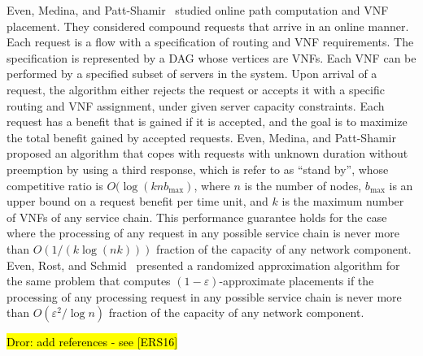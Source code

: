 \documentclass[runningheads]{llncs}
\newcommand{\eps}{\varepsilon}
\newcommand{\dror}[1]{\sethlcolor{yellow}\hl{Dror: #1}}
\begin{document}
Even, Medina, and Patt-Shamir~\cite{EMP16} studied online path
computation and VNF placement.  They considered compound requests that
arrive in an online manner.  Each request is a flow with a
specification of routing and VNF requirements.  The specification is
represented by a DAG whose vertices are VNFs.  Each VNF can be
performed by a specified subset of servers in the system.  Upon
arrival of a request, the algorithm either rejects the request or
accepts it with a specific routing and VNF assignment, under given
server capacity constraints.  Each request has a benefit that is
gained if it is accepted, and the goal is to maximize the total
benefit gained by accepted requests.
%
Even, Medina, and Patt-Shamir~\cite{EMP16} proposed an algorithm that
copes with requests with unknown duration without preemption by using
a third response, which is refer to as “stand by”, whose competitive
ratio is $O(\log (knb_{\max})$, where $n$ is the number of nodes,
$b_{\max}$ is an upper bound on a request benefit per time unit, and
$k$ is the maximum number of VNFs of any service chain.  This
performance guarantee holds for the case where the processing of any
request in any possible service chain is never more than
$O(1/(k \log (nk)))$ fraction of the capacity of any network
component.
%
Even, Rost, and Schmid~\cite{ERS16} presented a randomized
approximation algorithm for the same problem that computes
$(1-\eps)$-approximate placements if the processing of any processing
request in any possible service chain is never more than
$O(\eps^2/\log n)$ fraction of the capacity of any network component.

\dror{add references - see [ERS16]}
\end{document}
